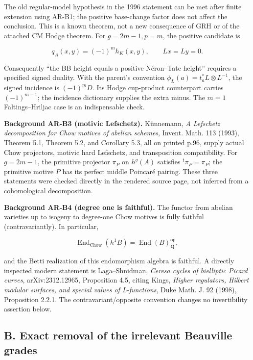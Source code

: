 \documentclass[11pt,a4paper]{article}
\begin{document}
The old regular-model hypothesis in the 1996 statement can be met after
finite extension using AR-B1; the positive base-change factor does not
affect the conclusion. This is a known theorem, not a new consequence of
GRH or of the attached CM Hodge theorem. For \(g=2m-1,p=m\), the
positive candidate is

\[
q_A(x,y)=(-1)^m h_K(x,y),\qquad Lx=Ly=0.
\tag{AR.1}
\]

Consequently ``the BB height equals a positive Néron--Tate height''
requires a specified signed duality. With the parent's convention
\(\phi_L(a)=t_a^*L\otimes L^{-1}\), the signed incidence is
\((-1)^m D\). Its Hodge cup-product counterpart carries \((-1)^{m-1}\);
the incidence dictionary supplies the extra minus. The \(m=1\)
Faltings--Hriljac case is an indispensable check.

\textbf{Background AR-B3 (motivic Lefschetz).} Künnemann, \emph{A
Lefschetz decomposition for Chow motives of abelian schemes}, Invent.
Math. 113 (1993), Theorem 5.1, Theorem 5.2, and Corollary 5.3, all on
printed p.96, supply actual Chow projectors, motivic hard Lefschetz, and
transposition compatibility. For \(g=2m-1\), the primitive projector
\(\pi_P\) on \(h^g(A)\) satisfies \({}^t\pi_P=\pi_P\); the primitive
motive \(P\) has its perfect middle Poincaré pairing. These three
statements were checked directly in the rendered source page, not
inferred from a cohomological decomposition.

\textbf{Background AR-B4 (degree one is faithful).} The functor from
abelian varieties up to isogeny to degree-one Chow motives is fully
faithful (contravariantly). In particular,

\[
\operatorname{End}_{\mathrm{Chow}}(h^1B)=\operatorname{End}(B)_{\mathbf Q}^{\mathrm{op}},
\]

and the Betti realization of this endomorphism algebra is faithful. A
directly inspected modern statement is Laga--Shnidman, \emph{Ceresa
cycles of bielliptic Picard curves}, arXiv:2312.12965, Proposition 4.5,
citing Kings, \emph{Higher regulators, Hilbert modular surfaces, and
special values of L-functions}, Duke Math. J. 92 (1998), Proposition
2.2.1. The contravariant/opposite convention changes no invertibility
assertion below.

\subsection{B. Exact removal of the irrelevant Beauville
grades}\label{b.-exact-removal-of-the-irrelevant-beauville-grades}
\end{document}
